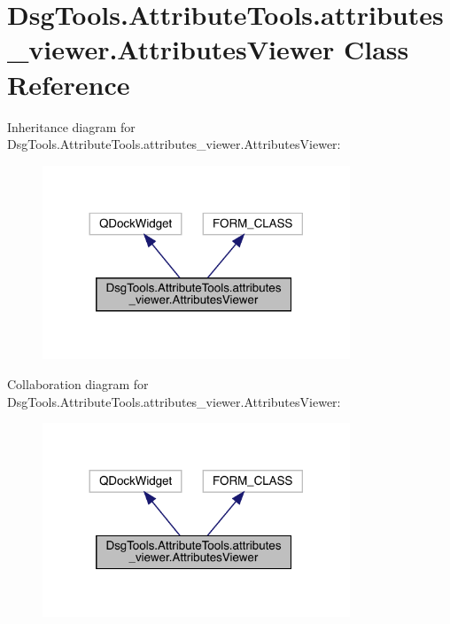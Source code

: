 \hypertarget{class_dsg_tools_1_1_attribute_tools_1_1attributes__viewer_1_1_attributes_viewer}{}\section{Dsg\+Tools.\+Attribute\+Tools.\+attributes\+\_\+viewer.\+Attributes\+Viewer Class Reference}
\label{class_dsg_tools_1_1_attribute_tools_1_1attributes__viewer_1_1_attributes_viewer}


Inheritance diagram for Dsg\+Tools.\+Attribute\+Tools.\+attributes\+\_\+viewer.\+Attributes\+Viewer\+:
\nopagebreak
\begin{figure}[H]
\begin{center}
\leavevmode
\includegraphics[width=260pt]{class_dsg_tools_1_1_attribute_tools_1_1attributes__viewer_1_1_attributes_viewer__inherit__graph}
\end{center}
\end{figure}


Collaboration diagram for Dsg\+Tools.\+Attribute\+Tools.\+attributes\+\_\+viewer.\+Attributes\+Viewer\+:
\nopagebreak
\begin{figure}[H]
\begin{center}
\leavevmode
\includegraphics[width=260pt]{class_dsg_tools_1_1_attribute_tools_1_1attributes__viewer_1_1_attributes_viewer__coll__graph}
\end{center}
\end{figure}
